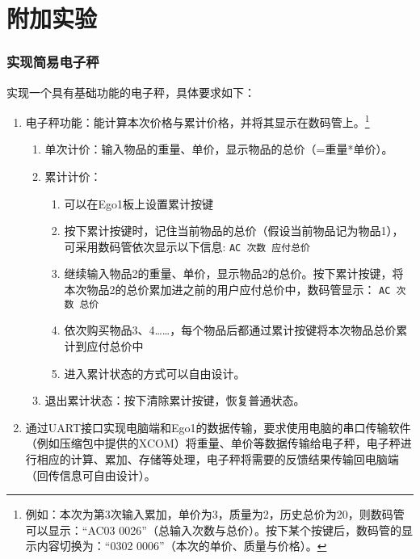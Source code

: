 \section{附加实验}



\subsubsection{实现简易电子秤}\label{sss: 5.4}
实现一个具有基础功能的电子秤，具体要求如下：

\begin{enumerate}
    \item 电子秤功能：能计算本次价格与累计价格，并将其显示在数码管上。\footnote{例如：本次为第3次输入累加，单价为3，质量为2，历史总价为20，则数码管可以显示：“AC03 0026”（总输入次数与总价）。按下某个按键后，数码管的显示内容切换为：“0302 0006”（本次的单价、质量与价格）。}
          \begin{enumerate}
              \item 单次计价：输入物品的重量、单价，显示物品的总价（=重量*单价）。
              \item 累计计价：
                    \begin{enumerate}
                        \item 可以在Ego1板上设置累计按键
                        \item 按下累计按键时，记住当前物品的总价（假设当前物品记为物品1），可采用数码管依次显示以下信息:
                              \subitem \verb|AC 次数 应付总价|
                        \item 继续输入物品2的重量、单价，显示物品2的总价。按下累计按键，将本次物品2的总价累加进之前的用户应付总价中，数码管显示：
                              \subitem \verb|AC 次数 总价|
                        \item 依次购买物品3、4……，每个物品后都通过累计按键将本次物品总价累计到应付总价中
                        \item 进入累计状态的方式可以自由设计。
                    \end{enumerate}
              \item 退出累计状态：按下清除累计按键，恢复普通状态。
          \end{enumerate}
    \item 通过UART接口实现电脑端和Ego1的数据传输，要求使用电脑的串口传输软件（例如压缩包中提供的XCOM）将重量、单价等数据传输给电子秤，电子秤进行相应的计算、累加、存储等处理，电子秤将需要的反馈结果传输回电脑端（回传信息可自由设计）。

\end{enumerate}
